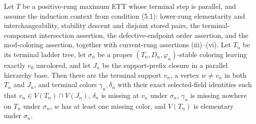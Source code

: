\begin{helper}
Let $T$ be a positive-rung maximum ETT whose terminal step is parallel,
and assume the induction context from condition (5.1): lower-rung
elementarity and interchangeability, stability descent and disjoint stored
pairs, the terminal-component intersection assertion, the defective-endpoint
order assertion, and the mod-coloring assertion, together with current-rung
assertions (iii)--(vi).  Let $T_n$ be its terminal
ladder tree, let $\sigma_n$ be a proper
$(T_n,D_n,\varphi_n)$-stable coloring leaving exactly $e_0$ uncolored, and
let $J_n$ be the support-prefix closure in a parallel hierarchy base.
Then there are the terminal support $v_n$, a vertex $w\ne v_n$ in both
$T_n$ and $J_n$, and terminal colors
$\gamma_n,\delta_n$ with their exact selected-field identities such that
$v_n\in V(T_n)\cap V(J_n)$, $\delta_n$ is missing at $v_n$ under
$\sigma_n$, $\gamma_n$ is missing nowhere on $T_n$ under $\sigma_n$,
$w$ has at least one missing color, and $V(T_n)$ is elementary under
$\sigma_n$.
\end{helper}
